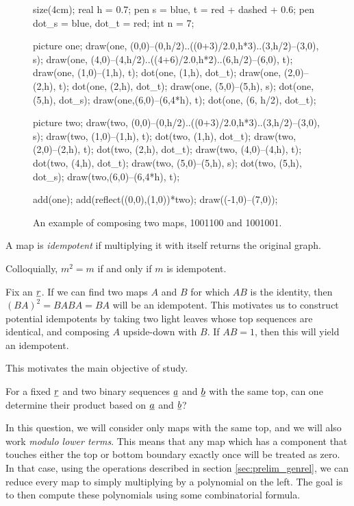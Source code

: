 \begin{figure}[ht]
	\centering
	\begin{asy}
	size(4cm);
	real h = 0.7;
	pen s = blue, t = red + dashed + 0.6;
	pen dot_s = blue, dot_t = red;
	int n = 7;

	picture one;
	draw(one, (0,0)--(0,h/2)..((0+3)/2.0,h*3)..(3,h/2)--(3,0), s);
	draw(one, (4,0)--(4,h/2)..((4+6)/2.0,h*2)..(6,h/2)--(6,0), t);
	draw(one, (1,0)--(1,h), t);
	dot(one, (1,h), dot_t);
	draw(one, (2,0)--(2,h), t);
	dot(one, (2,h), dot_t);
	draw(one, (5,0)--(5,h), s);
	dot(one, (5,h), dot_s);
	draw(one,(6,0)--(6,4*h), t);
	dot(one, (6, h/2), dot_t);

	picture two;
	draw(two, (0,0)--(0,h/2)..((0+3)/2.0,h*3)..(3,h/2)--(3,0), s);
	draw(two, (1,0)--(1,h), t);
	dot(two, (1,h), dot_t);
	draw(two, (2,0)--(2,h), t);
	dot(two, (2,h), dot_t);
	draw(two, (4,0)--(4,h), t);
	dot(two, (4,h), dot_t);
	draw(two, (5,0)--(5,h), s);
	dot(two, (5,h), dot_s);
	draw(two,(6,0)--(6,4*h), t);

	add(one); add(reflect((0,0),(1,0))*two);
	draw((-1,0)--(7,0));
	\end{asy}
	\caption{An example of composing two maps, 1001100 and 1001001.}
\end{figure}

\begin{definition*}
	A map is \emph{idempotent} if multiplying it with itself returns the original graph.
\end{definition*}
Colloquially, $m^2=m$ if and only if $m$ is idempotent.

Fix an $\underline{r}$.  If we can find two maps $A$ and $B$ for which $AB$ is the identity, then $(BA)^2=BABA=BA$ will be an idempotent.  This motivates us to construct potential idempotents by taking two light leaves whose top sequences are identical, and composing $A$ upside-down with $B$.  If $AB=1$, then this will yield an idempotent.

This motivates the main objective of study.
\begin{ques*}
	For a fixed $\underline{r}$ and two binary sequences $\underline{a}$ and $\underline{b}$ with the same top, can one determine their product based on $\underline{a}$ and $\underline{b}$?
\end{ques*}

In this question, we will consider only maps with the same top, and we will also work \emph{modulo lower terms}.  This means that any map which has a component that touches either the top or bottom boundary exactly once will be treated as zero.  In that case, using the operations described in section \ref{sec:prelim_genrel}, we can reduce every map to simply multiplying by a polynomial on the left.  The goal is to then compute these polynomials using some combinatorial formula.


